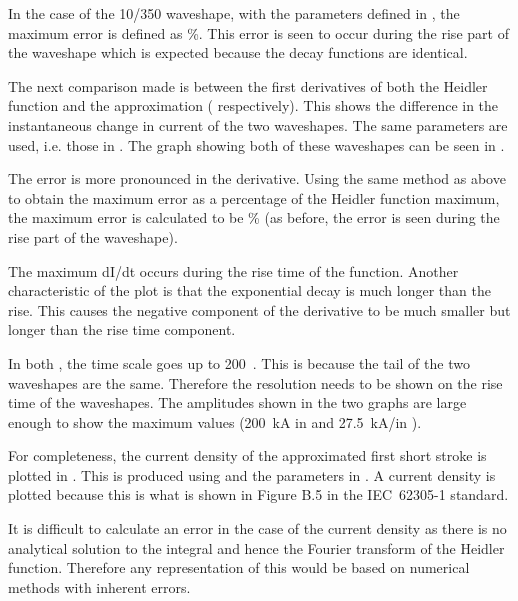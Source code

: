 In the case of the 10/350 waveshape, with the parameters defined in , the maximum error is defined as \unskip \%. This error is seen to occur during the rise part of the waveshape which is expected because the decay functions are identical.

The next comparison made is between the first derivatives of both the Heidler function and the approximation ( respectively). This shows the difference in the instantaneous change in current of the two waveshapes. The same parameters are used, i.e. those in . The graph showing both of these waveshapes can be seen in .

The error is more pronounced in the derivative. Using the same method as above to obtain the maximum error as a percentage of the Heidler function maximum, the maximum error is calculated to be \unskip \% (as before, the error is seen during the rise part of the waveshape).

The maximum dI/dt occurs during the rise time of the function. Another characteristic of the plot is that the exponential decay is much longer than the rise. This causes the negative component of the derivative to be much smaller but longer than the rise time component.

In both , the time scale goes up to 200~\usec. This is because the tail of the two waveshapes are the same. Therefore the resolution needs to be shown on the rise time of the waveshapes. The amplitudes shown in the two graphs are large enough to show the maximum values (200~kA in  and 27.5~kA/\usec in ).

For completeness, the current density of the approximated first short stroke is plotted in . This is produced using  and the parameters in . A current density is plotted because this is what is shown in Figure B.5 in the IEC~62305-1 standard.

It is difficult to calculate an error in the case of the current density as there is no analytical solution to the integral and hence the Fourier transform of the Heidler function. Therefore any representation of this would be based on numerical methods with inherent errors.

